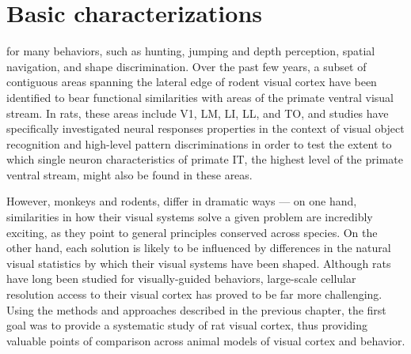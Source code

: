 
\chapter{Basic characterizations}



 for many behaviors, such as hunting, jumping and depth perception, spatial navigation, and shape discrimination. Over the past few years, a subset of contiguous areas spanning the lateral edge of rodent visual cortex have been identified to bear functional similarities with areas of the primate ventral visual stream\cite{Vermaercke2014, Tafazoli2017, Vinken2016,Matteucci2019b,Froudarakis2020}. In rats, these areas include V1, LM, LI, LL, and TO, and studies have specifically investigated neural responses properties in the context of visual object recognition and high-level pattern discriminations in order to test the extent to which single neuron characteristics of primate IT, the highest level of the primate ventral stream, might also be found in these areas.

However, monkeys and rodents, differ in dramatic ways --- on one hand, similarities in how their visual systems solve a given problem are incredibly exciting, as they point to general principles conserved across species. On the other hand, each solution is likely to be influenced by differences in the natural visual statistics by which their visual systems have been shaped. Although rats have long been studied for visually-guided behaviors, large-scale cellular resolution access to their visual cortex has proved to be far more challenging. Using the methods and approaches described in the previous chapter, the first goal was to provide a systematic study of rat visual cortex, thus providing valuable points of comparison across animal models of visual cortex and behavior.

